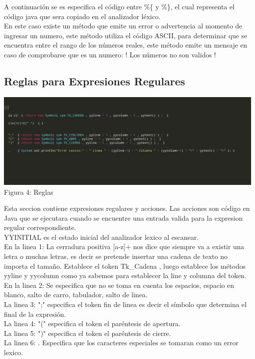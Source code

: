 \documentclass[a4paper,openright,12pt]{article}
\begin{document}
A continuación se es especifica el código entre \%\{ y \%\}, el cual representa el código java que sera copiado en el analizador léxico.\\

En este caso existe un método que emite un error o advertencia al 
momento de ingresar un numero, este método utiliza el código ASCII, para
determinar que se encuentra entre el rango de los números reales, este método
emite un mensaje en caso de comprobarse que es un numero: ! Los números no son validos !


\subsection{Reglas para Expresiones Regulares}

\begin{center}
\includegraphics[height=0.25\textheight]{expres.png}
\\
Figura 4: Reglas
\end{center}

Esta seccion contiene expresiones regulares y acciones. Las acciones son código en Java que se ejecutara cuando se encuentre una entrada valida para la expresion regular correspondiente.\\

YYINITIAL es el estado inicial del analizador lexico al escanear.\\

En la linea 1: La cerradura positiva [a-z]+ nos dice que siempre va a existir una letra o muchas letras, es decir se pretende insertar una cadena de texto no importa el tamaño. Establece el token Tk\_Cadena , luego establece los métodos yyline y yycolumn  como ya sabemos para establecer la line y columna del token.\\

En la linea 2:  Se especifica que no se toma en cuenta los espacios, espacio en blanco, salto de carro, tabulador, salto de linea.\\


La linea 3: ";" especifica el token fin de linea es decir el símbolo que determina el final de la expresión.\\
La linea 4: "(" especifica el token el paréntesis de apertura.\\
La linea 5: ")" especifica el token el paréntesis de cierre.\\
La linea 6: . Especifica que los caracteres especiales se tomaran como un error lexico.\\
\end{document}

